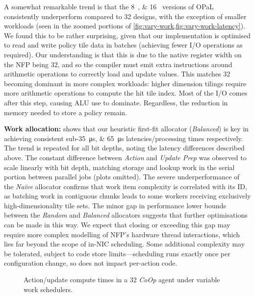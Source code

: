 \documentclass[sigconf,natbib=false]{acmart}
\newcommand{\fakepara}[1]{\noindent\textbf{#1:}}
\newcommand{\approachshort}{OPaL}
\newcommand{\Coopfw}{\emph{CoOp}}
\begin{document}
A somewhat remarkable trend is that the \SIlist{8;16}{\bit} versions of \approachshort{} consistently underperform compared to \SI{32}{\bit} designs, with the exception of smaller workloads (seen in the zoomed portions of \cref{fig:vary-work,fig:vary-work-latency}).
We found this to be rather surprising, given that our implementation is optimised to read and write policy tile data in batches (achieving fewer I/O operations as required).
Our understanding is that this is due to the native register width on the NFP being \SI{32}{\bit}, and so the compiler must emit extra instructions around arithmetic operations to correctly load and update values.
This matches \SI{32}{\bit} becoming dominant in more complex workloads: higher dimension tilings require more arithmetic operations to compute the hit tile index.
Most of the I/O comes after this step, causing ALU use to dominate.
Regardless, the reduction in memory needed to store a policy remain.

\fakepara{Work allocation}
 shows that our heuristic first-fit allocator (\emph{Balanced}) is key in achieving consistent sub-\SIlist{35;65}{\micro\second} latencies/processing times respectively.
The trend is repeated for all bit depths, noting the latency differences described above.
The constant difference between \emph{Action} and \emph{Update Prep} was observed to scale linearly with bit depth, matching storage and lookup work in the serial portion between parallel jobs (plots omitted).
The severe underperformance of the \emph{Na\"{i}ve} allocator confirms that work item complexity is correlated with its ID, as batching work in contiguous chunks leads to some workers receiving exclusively high-dimensionality tile sets.
The minor gap in performance lower bounds between the \emph{Random} and \emph{Balanced} allocators suggests that further optimisations can be made in this way.
We expect that closing or exceeding this gap may require more complex modelling of NFP's hardware thread interactions, which lies far beyond the scope of in-NIC scheduling.
Some additional complexity may be tolerated, subject to code store limits---scheduling runs exactly once per configuration change, so does not impact per-action code.

\begin{figure}
	\caption{Action/update compute times in a \SI{32}{\bit} \Coopfw{} agent under variable work schedulers.\label{fig:work-alloc-32}}
\end{figure}
\end{document}
